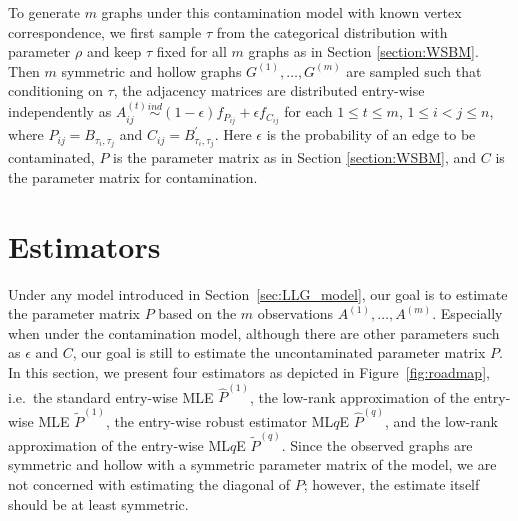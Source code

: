 To generate $m$ graphs under this contamination model with known vertex correspondence, we first sample $\tau$ from the categorical distribution with parameter $\rho$ and keep $\tau$ fixed for all $m$ graphs as in Section \ref{section:WSBM}. Then $m$ symmetric and hollow graphs $G^{(1)}, \dotsc, G^{(m)}$ are sampled such that conditioning on $\tau$, the adjacency matrices are distributed entry-wise independently as $A^{(t)}_{ij} \stackrel{ind}{\sim} (1-\epsilon) f_{P_{ij}} + \epsilon f_{C_{ij}}$ for each $1 \le t \le m$, $1 \le i < j \le n$, where $P_{ij} = B_{\tau_i, \tau_j}$ and $C_{ij} = B^{\prime}_{\tau_i, \tau_j}$. Here $\epsilon$ is the probability of an edge to be contaminated, $P$ is the parameter matrix as in Section \ref{section:WSBM}, and $C$ is the parameter matrix for contamination.




\section{Estimators}
\label{sec:robust_LLG_estimator}

Under any model introduced in Section~\ref{sec:LLG_model}, our goal is to estimate the parameter matrix $P$ based on the $m$ observations $A^{(1)}, \dotsc, A^{(m)}$. Especially when under the contamination model, although there are other parameters such as $\epsilon$ and $C$, our goal is still to estimate the uncontaminated parameter matrix $P$. In this section, we present four estimators as depicted in Figure~\ref{fig:roadmap}, i.e.\ the standard entry-wise MLE $\hat{P}^{(1)}$, the low-rank approximation of the entry-wise MLE $\widetilde{P}^{(1)}$, the entry-wise robust estimator ML$q$E $\hat{P}^{(q)}$, and the low-rank approximation of the entry-wise ML$q$E $\widetilde{P}^{(q)}$. Since the observed graphs are symmetric and hollow with a symmetric parameter matrix of the model, we are not concerned with estimating the diagonal of $P$; however, the estimate itself should be at least symmetric.


